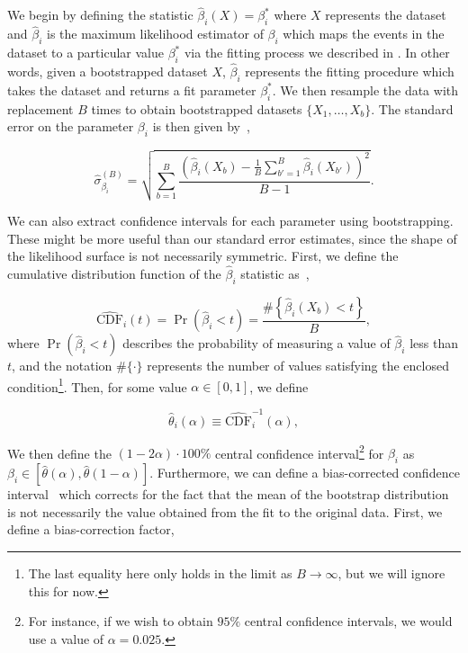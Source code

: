We begin by defining the statistic $\hat{\beta}_i(X) = \beta_i^*$ where $X$ represents the dataset and $\hat{\beta}_i$ is the maximum likelihood estimator of $\beta_i$ which maps the events in the dataset to a particular value $\beta_i^*$ via the fitting process we described in . In other words, given a bootstrapped dataset $X$, $\hat{\beta}_i$ represents the fitting procedure which takes the dataset and returns a fit parameter $\beta^*_i$. We then resample the data with replacement $B$ times to obtain bootstrapped datasets $\{X_1,\ldots,X_b\}$. The standard error on the parameter $\beta_i$ is then given by~\cite{Efron1981},

\begin{equation}
  \hat{\sigma}_{\beta_i}^{(B)} = \sqrt{\sum_{b=1}^{B}\frac{\left(\hat{\beta}_i(X_b) - \frac{1}{B}\sum_{b'=1}^{B} \hat{\beta}_i(X_{b'}) \right)^2}{B-1}}.
  \label{eq:bootstrap-standard-error}
\end{equation}

We can also extract confidence intervals for each parameter using bootstrapping. These might be more useful than our standard error estimates, since the shape of the likelihood surface is not necessarily symmetric. First, we define the cumulative distribution function of the $\hat{\beta}_i$ statistic as~\cite{Efron1981},

\begin{equation}
  \hat{\text{CDF}}_i(t) = \Pr(\hat{\beta}_i < t) = \frac{\#\left\{\hat{\beta}_i(X_b) < t\right\}}{B},
\end{equation}
where $\Pr(\hat{\beta}_i < t)$ describes the probability of measuring a value of $\hat{\beta}_i$ less than $t$, and the notation $\#\{\cdot\}$ represents the number of values satisfying the enclosed condition\footnote{The last equality here only holds in the limit as $B\to\infty$, but we will ignore this for now.}. Then, for some value $\alpha \in [0, 1]$, we define

\begin{equation}
  \hat{\theta}_i(\alpha) \equiv \hat{\text{CDF}}_i^{-1}(\alpha),
\end{equation}

We then define the $(1 - 2\alpha)\cdot 100\%$ central confidence interval\footnote{For instance, if we wish to obtain $95\%$ central confidence intervals, we would use a value of $\alpha = 0.025$.} for $\beta_i$ as $\beta_i \in [\hat{\theta}(\alpha),\hat{\theta}(1 - \alpha)]$. Furthermore, we can define a bias-corrected confidence interval~\cite{Efron1981} which corrects for the fact that the mean of the bootstrap distribution is not necessarily the value obtained from the fit to the original data. First, we define a bias-correction factor,

